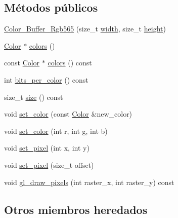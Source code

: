 \subsection*{Métodos públicos}
\begin{DoxyCompactItemize}
\item 
\mbox{\hyperlink{classexample_1_1_color___buffer___rgb565_a06909e8edbc20bcfb6701b8d9b1ec311}{Color\+\_\+\+Buffer\+\_\+\+Rgb565}} (size\+\_\+t \mbox{\hyperlink{classexample_1_1_color___buffer_ab61454d4b35cbba00d2e634d14ed20ac}{width}}, size\+\_\+t \mbox{\hyperlink{classexample_1_1_color___buffer_ae01f4538ee30af1d3072a425c5ad37ac}{height}})
\item 
\mbox{\hyperlink{structexample_1_1_color___buffer___rgb565_1_1_color}{Color}} $\ast$ \mbox{\hyperlink{classexample_1_1_color___buffer___rgb565_a30c98c79fa4b0fc07d031a70b11ede8b}{colors}} ()
\item 
const \mbox{\hyperlink{structexample_1_1_color___buffer___rgb565_1_1_color}{Color}} $\ast$ \mbox{\hyperlink{classexample_1_1_color___buffer___rgb565_a6b70754a098cda8d093f790d6a0f7386}{colors}} () const
\item 
int \mbox{\hyperlink{classexample_1_1_color___buffer___rgb565_ad8125e1f708bd99aafce8ef7b713cc02}{bits\+\_\+per\+\_\+color}} () const
\item 
size\+\_\+t \mbox{\hyperlink{classexample_1_1_color___buffer___rgb565_a06c7547d382ceba07f96f0b8841c35de}{size}} () const
\item 
void \mbox{\hyperlink{classexample_1_1_color___buffer___rgb565_a416142e2f71407a88cc2eebf61a68b47}{set\+\_\+color}} (const \mbox{\hyperlink{structexample_1_1_color___buffer___rgb565_1_1_color}{Color}} \&new\+\_\+color)
\item 
void \mbox{\hyperlink{classexample_1_1_color___buffer___rgb565_ac38babd86731bf63703875706b0138c6}{set\+\_\+color}} (int r, int g, int b)
\item 
void \mbox{\hyperlink{classexample_1_1_color___buffer___rgb565_a0f3e81af58dbe0b6456c239b24221baa}{set\+\_\+pixel}} (int x, int y)
\item 
void \mbox{\hyperlink{classexample_1_1_color___buffer___rgb565_a53f9763360ddbb788e0dfa0ec5a0a9f9}{set\+\_\+pixel}} (size\+\_\+t offset)
\item 
void \mbox{\hyperlink{classexample_1_1_color___buffer___rgb565_a990c8e8f928b672ab82f7364b12eadb2}{gl\+\_\+draw\+\_\+pixels}} (int raster\+\_\+x, int raster\+\_\+y) const
\end{DoxyCompactItemize}
\subsection*{Otros miembros heredados}


